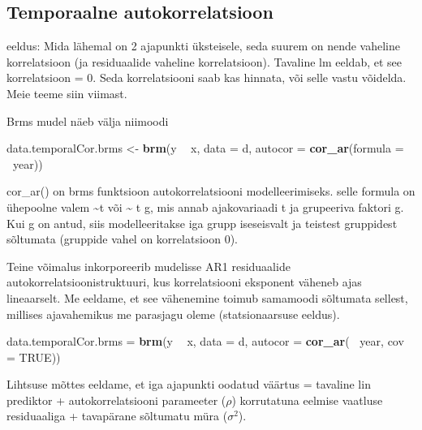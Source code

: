 \documentclass[]{book}
\newenvironment{Shaded}{\begin{snugshade}}{\end{snugshade}}
\newcommand{\KeywordTok}[1]{\textcolor[rgb]{0.13,0.29,0.53}{\textbf{#1}}}
\newcommand{\DataTypeTok}[1]{\textcolor[rgb]{0.13,0.29,0.53}{#1}}
\newcommand{\StringTok}[1]{\textcolor[rgb]{0.31,0.60,0.02}{#1}}
\newcommand{\OtherTok}[1]{\textcolor[rgb]{0.56,0.35,0.01}{#1}}
\newcommand{\OperatorTok}[1]{\textcolor[rgb]{0.81,0.36,0.00}{\textbf{#1}}}
\newcommand{\NormalTok}[1]{#1}
\begin{document}
\subsection{Temporaalne
autokorrelatsioon}\label{temporaalne-autokorrelatsioon}

eeldus: Mida lähemal on 2 ajapunkti üksteisele, seda suurem on nende
vaheline korrelatsioon (ja residuaalide vaheline korrelatsioon).
Tavaline lm eeldab, et see korrelatsioon = 0. Seda korrelatsiooni saab
kas hinnata, või selle vastu võidelda. Meie teeme siin viimast.

Brms mudel näeb välja niimoodi

\begin{Shaded}
\begin{Highlighting}[]
\NormalTok{data.temporalCor.brms <-}\StringTok{  }\KeywordTok{brm}\NormalTok{(y }\OperatorTok{~}\StringTok{ }\NormalTok{x, }\DataTypeTok{data =}\NormalTok{ d, }
                              \DataTypeTok{autocor =} \KeywordTok{cor_ar}\NormalTok{(}\DataTypeTok{formula =} \OperatorTok{~}\NormalTok{year))}
\end{Highlighting}
\end{Shaded}

cor\_ar() on brms funktsioon autokorrelatsiooni modelleerimiseks. selle
formula on ühepoolne valem \textasciitilde{}t või \textasciitilde{} t
\textbar{} g, mis annab ajakovariaadi t ja grupeeriva faktori g. Kui g
on antud, siis modelleeritakse iga grupp iseseisvalt ja teistest
gruppidest sõltumata (gruppide vahel on korrelatsioon 0).

Teine võimalus inkorporeerib mudelisse AR1 residuaalide
autokorrelatsioonistruktuuri, kus korrelatsiooni eksponent väheneb ajas
lineaarselt. Me eeldame, et see vähenemine toimub samamoodi sõltumata
sellest, millises ajavahemikus me parasjagu oleme (statsionaarsuse
eeldus).

\begin{Shaded}
\begin{Highlighting}[]
\NormalTok{data.temporalCor.brms =}\StringTok{ }\KeywordTok{brm}\NormalTok{(y }\OperatorTok{~}\StringTok{ }\NormalTok{x, }\DataTypeTok{data =}\NormalTok{ d, }
                            \DataTypeTok{autocor =} \KeywordTok{cor_ar}\NormalTok{( }\OperatorTok{~}\NormalTok{year, }\DataTypeTok{cov =} \OtherTok{TRUE}\NormalTok{))}
\end{Highlighting}
\end{Shaded}

Lihtsuse mõttes eeldame, et iga ajapunkti oodatud väärtus = tavaline lin
prediktor + autokorrelatsiooni parameeter (\(\rho\)) korrutatuna eelmise
vaatluse residuaaliga + tavapärane sõltumatu müra (\(\sigma^2\)).
\end{document}
